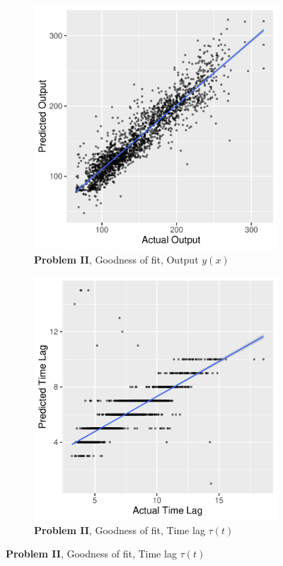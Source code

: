 \documentclass[envcountsect,runningheads]{llncs}
\theoremstyle{etoile}
\begin{document}
\begin{figure}
  \centering

  \begin{subfigure}[b]{0.4\textwidth}
    \centering
    \includegraphics[width=\textwidth]{figures/exp2_scatter_v_test}
    \caption{ \textbf{Problem II}, Goodness of fit, Output $y(x)$}
    \label{fig:problem2_fitv}
  \end{subfigure}
  \hfill
  \begin{subfigure}[b]{0.4\textwidth}
    \centering
    \includegraphics[width=\textwidth]{figures/exp2_scatter_t_test}
    \caption{ \textbf{Problem II}, Goodness of fit, Time lag $\tau(t)$ }
    \label{fig:problem2_fitt}
  \end{subfigure}
  

\end{figure}
\end{document}

